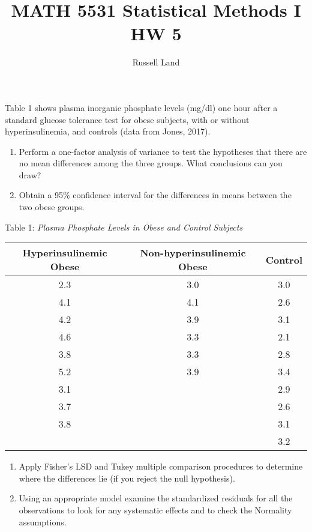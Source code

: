 \documentclass[oneside,10pt]{article}
\title{MATH 5531 Statistical Methods I HW 5}
\author{Russell Land}
\begin{document}
	\maketitle
		\begin{mdframed} Table 1 shows plasma inorganic phosphate levels (mg/dl) one hour after a standard glucose tolerance test for obese subjects, with or without hyperinsulinemia, and controls (data from Jones, 2017).
			\begin{enumerate}[label=(\alph*)]
				\item Perform a one-factor analysis of variance to test the hypotheses that there are no mean differences among the three groups. What conclusions can you draw?
				\item Obtain a 95\% confidence interval for the differences in means between the two obese groups.
			\end{enumerate}
			\begin{center}
				Table 1: \textit{Plasma Phosphate Levels in Obese and Control Subjects}\\[1mm]
				\renewcommand{\arraystretch}{1.2}
				\begin{tabular}{ c c c}
					\hline
					Hyperinsulinemic Obese & Non-hyperinsulinemic Obese & Control\\
					\hline
					2.3 & 3.0 & 3.0\\
					4.1 & 4.1 & 2.6\\
					4.2 & 3.9 & 3.1\\
					4.6 & 3.3 & 2.1\\
					3.8 & 3.3 & 2.8\\
					5.2 & 3.9 & 3.4\\
					3.1 & & 2.9\\
					3.7 & & 2.6\\
					3.8 & & 3.1\\
					& & 3.2\\
					\hline
				\end{tabular}
			\end{center}
		\begin{enumerate}[label=(\alph*)]
			\addtocounter{enumi}{2}
				\item Apply Fisher's LSD and Tukey multiple comparison procedures to determine where the differences lie (if you reject the null hypothesis).
				\item Using an appropriate model examine the standardized residuals for all the observations to look for any systematic effects and to check the Normality assumptions.
		\end{enumerate} \end{mdframed}
\end{document}
